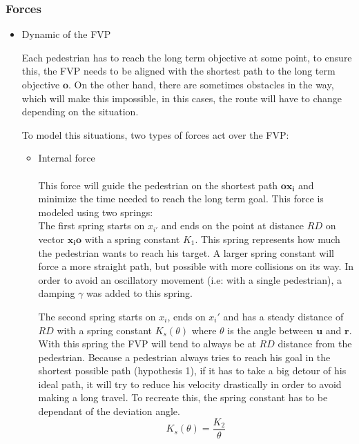 \documentclass[english]{article}
\numberwithin{equation}{section}
\numberwithin{figure}{section}
\begin{document}
\subsubsection{Forces}
\begin{itemize}
\item Dynamic of the FVP

Each pedestrian has to reach the long term objective at some point,
to ensure this, the FVP needs to be aligned with the
shortest path to the long term objective $\mathbf{o}$. On the other hand, there
are sometimes obstacles in the way, which will make this impossible,
in this cases, the route will have to change depending on the situation.

To model this situations, two types of forces act over the FVP:

\begin{itemize}
\item Internal force
\\
\\
This force will guide the pedestrian on the shortest path $\mathbf{ox_i}$ and minimize the time needed to reach the long term goal. This force is modeled using two springs:
\\

The first spring starts on $x_{i'}$ and ends on the point at distance $RD$ on vector $\mathbf{x_{i}o}$ with a spring constant $K_{1}$.
This spring represents how much the pedestrian wants to reach his target.
A larger spring constant will force a more straight path, but possible
with more collisions on its way.
In order to avoid an oscillatory movement (i.e: with a single pedestrian), a 
damping $\gamma$ was added to this spring.

The second spring starts on $x_i$, ends on $x_i'$ and has a steady 
distance of $RD$ with a spring constant $K_s(\theta)$ 
where $\theta$ is the angle between $\mathbf{u}$ and $\mathbf{r}$.
With this spring the FVP will tend to always be at $RD$ distance 
from the pedestrian.
Because a pedestrian always tries to reach his goal in the shortest
possible path (hypothesis 1), if it has to take a big detour of his
ideal path, it will try to reduce his velocity drastically in order
to avoid making a long travel. To recreate this, the
spring constant has to be dependant of the deviation angle. 
\[
K_s(\theta) = \frac{K_{2}}{\theta}
\]


\end{itemize}
\end{itemize}
\end{document}
